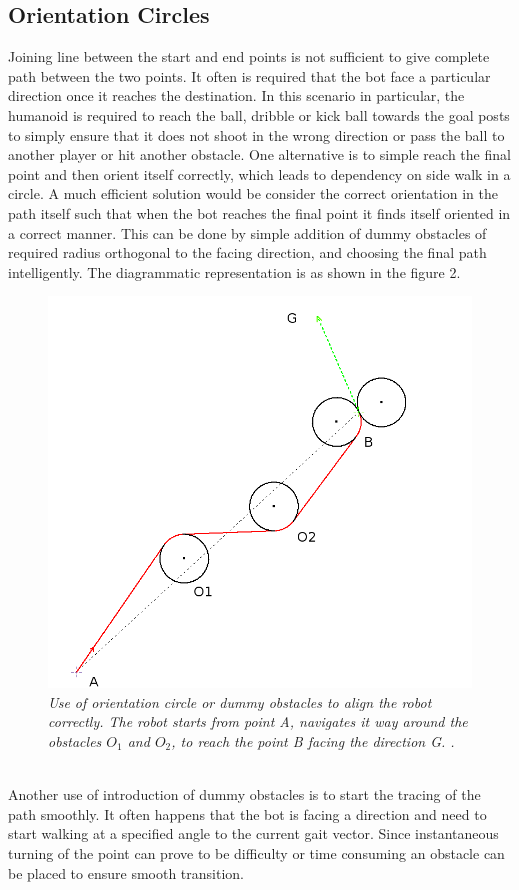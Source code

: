 \documentclass[letterpaper, 10 pt, conference]{ieeeconf}  %
\begin{document}
\subsection{Orientation Circles}
Joining line between the start and end points is not sufficient to give complete path between the two points. It often is required that the bot face a particular direction once it reaches the destination. In this scenario in particular, the humanoid is required to reach the ball, dribble or kick ball towards the goal posts to simply ensure that it does not shoot in the wrong direction or pass the ball to another player or hit another obstacle. One alternative is to simple reach the final point and then orient itself correctly, which leads to dependency on side walk in a circle. A much efficient solution would be consider the correct orientation in the path itself such that when the bot reaches the final point it finds itself oriented in a correct manner. This can be done by simple addition of dummy obstacles of required radius orthogonal to the facing direction, and choosing the final path intelligently. The diagrammatic representation is as shown in the figure 2. 
\begin{figure}[h]  
\begin{center}  
\includegraphics[scale=0.42]{orientation_circle2.JPG}  
\caption{\small \sl Use of orientation circle or dummy obstacles to align the robot correctly. The robot starts from point A, navigates it way around the obstacles $O_1$ and $O_2$, to reach the point B facing the direction G. .\label{fig:orientation}}  
\end{center}  
\end{figure} 
\\
Another use of introduction of dummy obstacles is to start the tracing of the path smoothly. It often happens that the bot is facing a direction and need to start walking at a specified angle to the current gait vector. Since instantaneous turning of the point can prove to be difficulty or time consuming an obstacle can be placed to ensure smooth transition.
\end{document}
